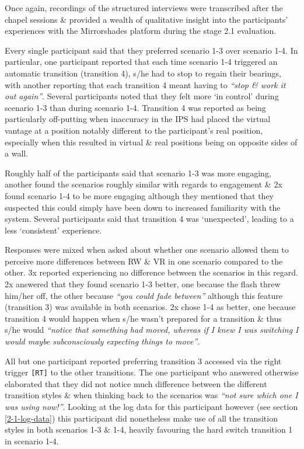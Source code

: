 Once again, recordings of the structured interviews were transcribed after the chapel sessions \& provided a wealth of qualitative insight into the participants' experiences with the Mirrorshades platform during the stage 2.1 evaluation.

Every single participant said that they preferred scenario 1-3 over scenario 1-4. In particular, one participant  reported that each time scenario 1-4 triggered an automatic transition (transition 4), s/he had to stop to regain their bearings, with another reporting that each transition 4 meant having to \textit{``stop \& work it out again''}. Several participants noted that they felt more `in control' during scenario 1-3 than during scenario 1-4. Transition 4 was reported as being particularly off-putting when inaccuracy in the IPS had placed the virtual vantage at a position notably different to the participant's real position, especially when this resulted in virtual \& real positions being on opposite sides of a wall.

Roughly half of the participants said that scenario 1-3 was more engaging, another found the scenarios roughly similar with regards to engagement \& 2x found scenario 1-4 to be more engaging although they mentioned that they suspected this could simply have been down to increased familiarity with the system. Several participants said that transition 4 was `unexpected', leading to a less `consistent' experience.

Responses were mixed when asked about whether one scenario allowed them to perceive more differences between RW \& VR in one scenario compared to the other. 3x reported experiencing no difference between the scenarios in this regard. 2x answered that they found scenario 1-3 better, one because the flash threw him/her off, the other because \textit{``you could fade between''}  although this feature (transition 3) was available in both scenarios. 2x chose 1-4 as better, one because transition 4 would happen when s/he wasn't prepared for a transition \& thus s/he would \textit{``notice that something had moved, whereas if I knew I was switching I would maybe subconsciously expecting things to move''}.

All but one participant reported preferring transition 3 accessed via the right trigger \texttt{[RT]} to the other transitions. The one participant who answered otherwise elaborated that they did not notice much difference between the different transition styles \& when thinking back to the scenarios was \textit{``not sure which one I was using now!''}. Looking at the log data for this participant however (see section \ref{2-1-log-data}) this participant did nonetheless make use of all the transition styles in both scenarios 1-3 \& 1-4, heavily favouring the hard switch transition 1 in scenario 1-4.

